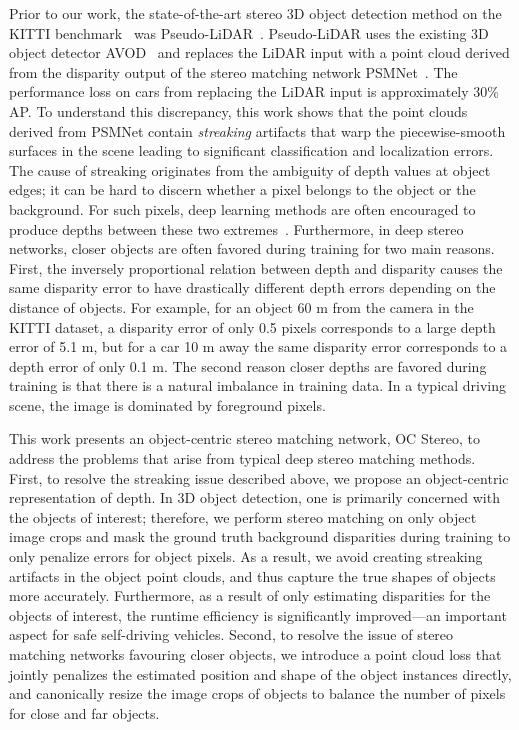 \documentclass[letterpaper, 10 pt, conference]{ieeeconf}
\begin{document}
Prior to our work, the state-of-the-art stereo 3D object detection method on the KITTI benchmark~\cite{geiger_kitti} was Pseudo-LiDAR~\cite{wang2018pseudo}. Pseudo-LiDAR uses the existing 3D object detector AVOD~\cite{ku_avod} and replaces the LiDAR input with a point cloud derived from the disparity output of the stereo matching network PSMNet~\cite{chang2018psmnet}. The performance loss on cars from replacing the LiDAR input is approximately 30\% AP. To understand this discrepancy, this work shows that the point clouds derived from PSMNet contain \textit{streaking} artifacts that warp the piecewise-smooth surfaces in the scene leading to significant classification and localization errors. The cause of streaking originates from the ambiguity of depth values at object edges; it can be hard to discern whether a pixel belongs to the object or the background. For such pixels, deep learning methods are often encouraged to produce depths between these two extremes~\cite{imran_depth_coefficients}. Furthermore, in deep stereo networks, closer objects are often favored during training for two main reasons. First, the inversely proportional relation between depth and disparity causes the same disparity error to have drastically different depth errors depending on the distance of objects. For example, for an object 60 m from the camera in the KITTI dataset, a disparity error of only 0.5 pixels corresponds to a large depth error of 5.1 m, but for a car 10 m away the same disparity error corresponds to a depth error of only 0.1 m. The second reason closer depths are favored during training is that there is a natural imbalance in training data. In a typical driving scene, the image is dominated by foreground pixels.

This work presents an object-centric stereo matching network, OC Stereo, to address the problems that arise from typical deep stereo matching methods. First, to resolve the streaking issue described above, we propose an object-centric representation of depth. In 3D object detection, one is primarily concerned with the objects of interest; therefore, we perform stereo matching on only object image crops and mask the ground truth background disparities during training to only penalize errors for object pixels. As a result, we avoid creating streaking artifacts in the object point clouds, and thus capture the true shapes of objects more accurately. Furthermore, as a result of only estimating disparities for the objects of interest, the runtime efficiency is significantly improved---an important aspect for safe self-driving vehicles. Second, to resolve the issue of stereo matching networks favouring closer objects, we introduce a point cloud loss that jointly penalizes the estimated position and shape of the object instances directly, and canonically resize the image crops of objects to balance the number of pixels for close and far objects.
\end{document}
